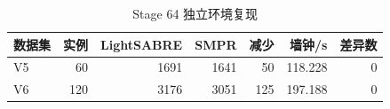 \begin{table}[H]
\centering
\small
\caption{Stage 64 独立环境复现}
\label{tab:stage64-reproduction}
\begin{tabular}{lrrrrrr}
\toprule
数据集 & 实例 & LightSABRE & SMPR & 减少 & 墙钟/s & 差异数 \\
\midrule
V5 & 60 & 1691 & 1641 &
50 & 118.228 & 0 \\
V6 & 120 & 3176 & 3051 &
125 & 197.188 & 0 \\
\bottomrule
\end{tabular}
\end{table}
